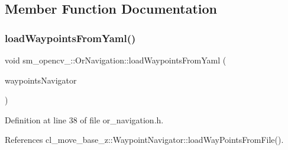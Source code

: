 \subsection{Member Function Documentation}
\mbox{\label{classsm__opencv__3_1_1OrNavigation_a50ca7c23fbda3bcfc117fca88fe2dfce}} 
\subsubsection{\texorpdfstring{load\+Waypoints\+From\+Yaml()}{loadWaypointsFromYaml()}}
{\footnotesize\ttfamily void sm\+\_\+opencv\+\_\+::\+Or\+Navigation\+::load\+Waypoints\+From\+Yaml (\begin{DoxyParamCaption}\item[{\hyperlink{classcl__move__base__z_1_1WaypointNavigator}{Waypoint\+Navigator} $\ast$}]{waypoints\+Navigator }\end{DoxyParamCaption})\hspace{0.3cm}{\ttfamily [inline]}}



Definition at line 38 of file or\+\_\+navigation.\+h.



References cl\+\_\+move\+\_\+base\+\_\+z\+::\+Waypoint\+Navigator\+::load\+Way\+Points\+From\+File().


